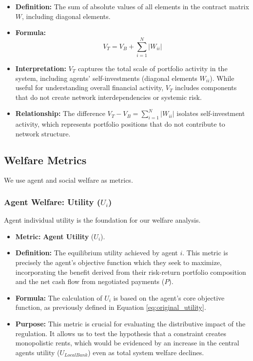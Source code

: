 \begin{itemize}
    \item \textbf{Definition:} The sum of absolute values of all elements in the contract matrix $W$, including diagonal elements.
    
    \item \textbf{Formula:}
    $$V_T =  V_B + \sum_{i=1}^N |W_{ii}|$$
    
    \item \textbf{Interpretation:} $V_T$ captures the total scale of portfolio activity in the system, including agents' self-investments (diagonal elements $W_{ii}$). While useful for understanding overall financial activity, $V_T$ includes components that do not create network interdependencies or systemic risk.
    
    \item \textbf{Relationship:} The difference $V_T - V_B = \sum_{i=1}^N |W_{ii}|$ isolates self-investment activity, which represents portfolio positions that do not contribute to network structure.
\end{itemize}

\subsection{Welfare Metrics}
We use agent and social welfare as metrics.
\subsubsection{Agent Welfare: Utility ($U_i$)}

Agent individual utility is the foundation for our welfare analysis.

\begin{itemize}
    \item \textbf{Metric:} \textbf{Agent Utility} ($U_i$).
    \item \textbf{Definition:} The equilibrium utility achieved by agent $i$. This metric is precisely the agent's objective function which they seek to maximize, incorporating the benefit derived from their risk-return portfolio composition and the net cash flow from negotiated payments ($P$).
    \item \textbf{Formula:} The calculation of $U_i$ is based on the agent's core objective function, as previously defined in Equation \ref{eq:original_utility}.
    \item \textbf{Purpose:} This metric is crucial for evaluating the distributive impact of the regulation. It allows us to test the hypothesis that a constraint creates monopolistic rents, which would be evidenced by an increase in the central agents utility ($U_{Local Bank}$) even as total system welfare declines.
\end{itemize}

